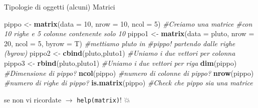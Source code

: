 \documentclass[
  ignorenonframetext,
]{beamer}
\newenvironment{Shaded}{\begin{snugshade}}{\end{snugshade}}
\newcommand{\CommentTok}[1]{\textcolor[rgb]{0.56,0.35,0.01}{\textit{#1}}}
\newcommand{\DataTypeTok}[1]{\textcolor[rgb]{0.13,0.29,0.53}{#1}}
\newcommand{\DecValTok}[1]{\textcolor[rgb]{0.00,0.00,0.81}{#1}}
\newcommand{\KeywordTok}[1]{\textcolor[rgb]{0.13,0.29,0.53}{\textbf{#1}}}
\newcommand{\NormalTok}[1]{#1}
\newcommand{\StringTok}[1]{\textcolor[rgb]{0.31,0.60,0.02}{#1}}
\begin{document}
\begin{frame}[fragile]{Tipologie di oggetti (alcuni)}
\protect\hypertarget{tipologie-di-oggetti-alcuni-1}{}
Matrici

\begin{Shaded}
\begin{Highlighting}[]
\NormalTok{pippo \textless{}{-}}\StringTok{ }\KeywordTok{matrix}\NormalTok{(}\DataTypeTok{data =} \DecValTok{10}\NormalTok{, }\DataTypeTok{nrow =} \DecValTok{10}\NormalTok{, }\DataTypeTok{ncol =} \DecValTok{5}\NormalTok{) }\CommentTok{\#Creiamo una matrice }
\CommentTok{\#con 10 righe e 5 colonne contenente solo 10}
\NormalTok{pippo1 \textless{}{-}}\StringTok{ }\KeywordTok{matrix}\NormalTok{(}\DataTypeTok{data =}\NormalTok{ pluto, }\DataTypeTok{nrow =} \DecValTok{20}\NormalTok{, }\DataTypeTok{ncol =} \DecValTok{5}\NormalTok{, }\DataTypeTok{byrow =}\NormalTok{ T) }\CommentTok{\#mettiamo pluto in}
\CommentTok{\#pippo! partendo dalle righe (byrow)}
\NormalTok{pippo2 \textless{}{-}}\StringTok{ }\KeywordTok{cbind}\NormalTok{(pluto,pluto1) }\CommentTok{\#Uniamo i due vettori per colonna}
\NormalTok{pippo3 \textless{}{-}}\StringTok{ }\KeywordTok{rbind}\NormalTok{(pluto,pluto1) }\CommentTok{\#Uniamo i due vettori per riga}
\KeywordTok{dim}\NormalTok{(pippo) }\CommentTok{\#Dimensione di pippo?}
\KeywordTok{ncol}\NormalTok{(pippo) }\CommentTok{\#numero di colonne di pippo?}
\KeywordTok{nrow}\NormalTok{(pippo) }\CommentTok{\#numero di righe di pippo?}
\KeywordTok{is.matrix}\NormalTok{(pippo) }\CommentTok{\#Check che pippo sia una matrice }
\end{Highlighting}
\end{Shaded}

se non vi ricordate \(\rightarrow\) \texttt{help(matrix)}! 💥
\end{frame}
\end{document}
